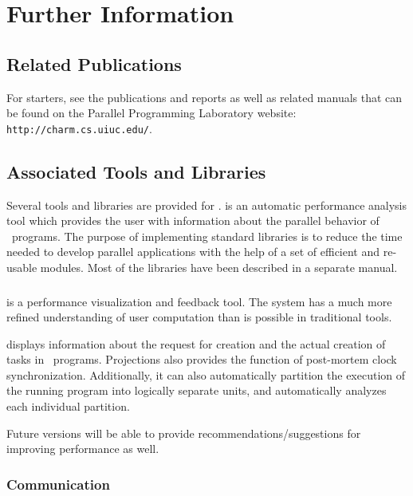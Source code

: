 \section{Further Information}

\subsection{Related Publications}
\label{publications}

For starters, see the publications and reports as well
as related manuals that can be found on the Parallel Programming
Laboratory website: \texttt{http://charm.cs.uiuc.edu/}. 

\subsection{Associated Tools and Libraries}

Several tools and libraries are provided for \charmpp{}. \projections{} 
is an automatic performance analysis tool which provides
the user with information about the parallel behavior of \charmpp\ programs. 
The purpose of implementing \charmpp{} standard
libraries is to reduce the time needed to develop parallel
applications with the help of a set of efficient and re-usable modules.
Most of the libraries have been described in a separate manual.

\subsubsection{\projections}

\projections{} is a performance visualization and feedback tool. The system has
a much more refined understanding of user computation than is possible in
traditional tools.

\projections{} displays information about the request for creation and the
actual creation of tasks in \charmpp\ programs. Projections also provides the
function of post-mortem clock synchronization. Additionally, it can also
automatically partition the execution of the running program into logically
separate units, and automatically analyzes each individual partition. 

Future versions will be able to provide recommendations/suggestions for
improving performance as well.

\subsubsection{Communication}

